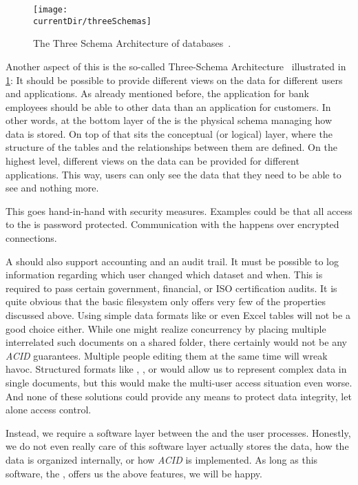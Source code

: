\begin{figure}%
\centering%
\texttt{[image: \\currentDir/threeSchemas]}%
\caption{The Three Schema Architecture of databases~\cite{AXSSGDMS1978FRODMS,TK1978TAXSDFROTSGODMS,BFJKMRGRT1985RMFDSDAFTGDOTAXSDSSG,SS2005EIDDDFDBI}.}%
\label{fig:threeSchemas}%
\end{figure}

Another aspect of this is the so-called Three-Schema Architecture~\cite{AXSSGDMS1978FRODMS,TK1978TAXSDFROTSGODMS,BFJKMRGRT1985RMFDSDAFTGDOTAXSDSSG,SS2005EIDDDFDBI} illustrated in \cref{fig:threeSchemas}:
It should be possible to provide different views on the data for different users and applications.
As already mentioned before, the application for bank employees should be able to  other data than an application for customers.
In other words, at the bottom layer of the  is the physical schema managing how data is stored.
On top of that sits the conceptual (or logical) layer, where the structure of the tables and the relationships between them are defined.
On the highest level, different views on the data can be provided for different applications.
This way, users can only see the data that they need to be able to see and nothing more.

This goes hand-in-hand with security measures.
Examples could be that all access to the  is password protected.
Communication with the  happens over encrypted connections.

A  should also support accounting and an audit trail.
It must be possible to log information regarding which user changed which dataset and when.
This is required to pass certain government, financial, or ISO certification audits.
\endhsection%
%
%
It is quite obvious that the basic filesystem only offers very few of the properties discussed above.
Using simple data formats like  or even Excel tables will not be a good choice either.
While one might realize concurrency by placing multiple interrelated such documents on a shared folder, there certainly would not be any \emph{ACID} guarantees.
Multiple people editing them at the same time will wreak havoc.
Structured formats like , , or  would allow us to represent complex data in single documents, but this would make the multi-user access situation even worse.
And none of these solutions could provide any means to protect data integrity, let alone access control.

Instead, we require a software layer between the  and the user processes.
Honestly, we do not even really care of this software layer actually stores the data, how the data is organized internally, or how \emph{ACID} is implemented.
As long as this software, the , offers us the above features, we will be happy.%
\endhsection%
\endhsection%
%
